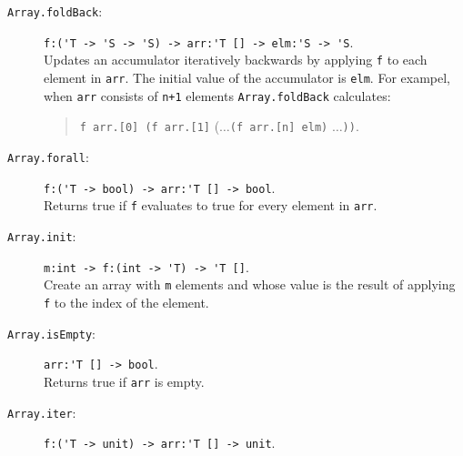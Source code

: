 \documentclass[springer.tex]{subfiles}
\begin{document}
\begin{description}
\begin{quote}
  \end{quote}
\item[\texttt{Array.foldBack}:] \lstinline{f:('T -> 'S -> 'S) -> arr:'T [] -> elm:'S -> 'S}.~\\
  Updates an accumulator iteratively backwards by applying \lstinline{f} to each element in \lstinline{arr}. The initial value of the accumulator is \lstinline{elm}. For exampel, when \lstinline{arr} consists of \lstinline{n+1} elements
  \lstinline{Array.foldBack} calculates:
  \begin{quote}
    \lstinline{f arr.[0] (f arr.[1]} ($\ldots$\lstinline{(f arr.[n] elm)} $\ldots$\lstinline{))}.
  \end{quote}
\item[\texttt{Array.forall}:] \lstinline{f:('T -> bool) -> arr:'T [] -> bool}.~\\
  Returns true if \lstinline{f} evaluates to true for every element in \lstinline{arr}.
\item[\texttt{Array.init}:] \lstinline{m:int -> f:(int -> 'T) -> 'T []}.~\\
  Create an array with \lstinline{m} elements and whose value is the result of applying \lstinline{f} to the index of the element.
\item[\texttt{Array.isEmpty}:] \lstinline{arr:'T [] -> bool}.~\\
  Returns true if \lstinline{arr} is empty.
\item[\texttt{Array.iter}:] \lstinline{f:('T -> unit) -> arr:'T [] -> unit}.~\\

\end{description}
\end{document}

